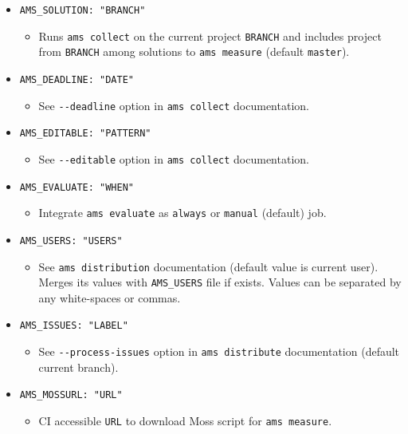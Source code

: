 \begin{itemize}
\item
  \texttt{AMS\_SOLUTION:\ "BRANCH"}

  \begin{itemize}
  \item
    Runs \texttt{ams\ collect} on the current project \texttt{BRANCH} and includes project from \texttt{BRANCH} among solutions to \texttt{ams\ measure} (default \texttt{master}).
  \end{itemize}
\item
  \texttt{AMS\_DEADLINE:\ "DATE"}

  \begin{itemize}
  \item
    See \texttt{-\/-deadline} option in \texttt{ams\ collect} documentation.
  \end{itemize}
\item
  \texttt{AMS\_EDITABLE:\ "PATTERN"}

  \begin{itemize}
  \item
    See \texttt{-\/-editable} option in \texttt{ams\ collect} documentation.
  \end{itemize}
\item
  \texttt{AMS\_EVALUATE:\ "WHEN"}

  \begin{itemize}
  \item
    Integrate \texttt{ams\ evaluate} as \texttt{always} or \texttt{manual} (default) job.
  \end{itemize}
\item
  \texttt{AMS\_USERS:\ "USERS"}

  \begin{itemize}
  \item
    See \texttt{ams\ distribution} documentation (default value is current user). \\Merges its values with \texttt{AMS\_USERS} file if exists. Values can be separated by any white-spaces or commas.
  \end{itemize}
\item
  \texttt{AMS\_ISSUES:\ "LABEL"}

  \begin{itemize}
  \item
    See \texttt{-\/-process-issues} option in \texttt{ams\ distribute} documentation (default current branch).
  \end{itemize}
\item
  \texttt{AMS\_MOSSURL:\ "URL"}

  \begin{itemize}
  \item
    CI accessible \texttt{URL} to download Moss script for \texttt{ams\ measure}.
  \end{itemize}
\end{itemize}
